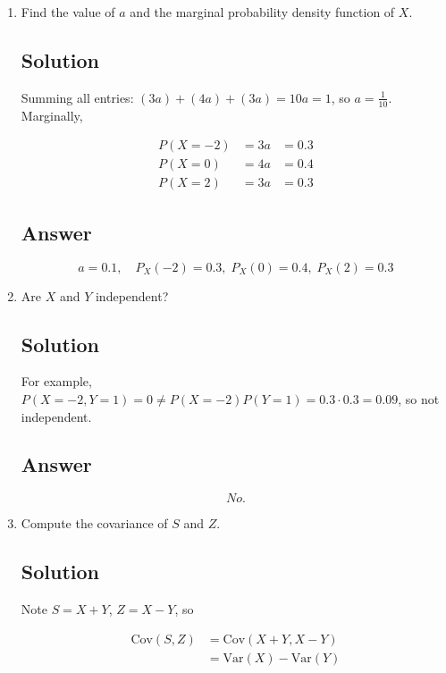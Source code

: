 \documentclass[12pt]{article}
\begin{document}
	\begin{enumerate}[start=1,label={\bfseries Part \arabic*:},leftmargin=0in]
		\bigskip\item Find the value of $a$ and the marginal probability density function of $X$.
		
		\subsection*{Solution}
		
			Summing all entries: $(3a)+(4a)+(3a)=10a=1$, so $a=\tfrac{1}{10}$. Marginally,
			
			\[
				\begin{aligned}
					P(X=-2)&=3a&=0.3\\
					P(X=0)&=4a&=0.4\\
					P(X=2)&=3a&=0.3
				\end{aligned}
			\]
		
		\subsection*{Answer}
		
			\[\boxed{a=0.1,\quad P_X(-2)=0.3,\;P_X(0)=0.4,\;P_X(2)=0.3}\]
		
		\bigskip\item Are $X$ and $Y$ independent?
		
		\subsection*{Solution}
		
			For example, $P(X=-2,Y=1)=0\ne P(X=-2)P(Y=1)=0.3\cdot0.3=0.09$, so not independent.
		
		\subsection*{Answer}
		
			\[\boxed{No.}\]
			
		\bigskip\item Compute the covariance of $S$ and $Z$.
		
		\subsection*{Solution}
		
			Note $S=X+Y$, $Z=X-Y$, so
			
			\[
				\begin{aligned}
					\mathrm{Cov}(S,Z)&=\mathrm{Cov}(X+Y,X-Y)\\
					&=\mathrm{Var}(X)-\mathrm{Var}(Y)
				\end{aligned}
			\]
			

\end{enumerate}
\end{document}

